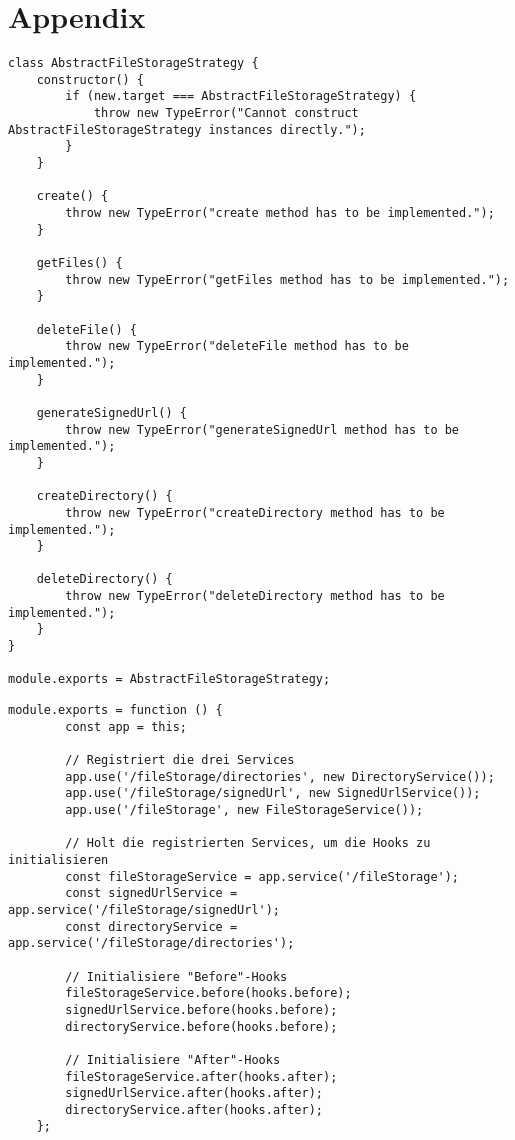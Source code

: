 \appendix
\section{Appendix}
\label{sec:appendix}

\begin{lstlisting}[caption=Abstract file storage strategy, label=code:strategyinterface]
class AbstractFileStorageStrategy {
	constructor() {
		if (new.target === AbstractFileStorageStrategy) {
			throw new TypeError("Cannot construct AbstractFileStorageStrategy instances directly.");
		}
	}
	
	create() {
		throw new TypeError("create method has to be implemented.");
	}
	
	getFiles() {
		throw new TypeError("getFiles method has to be implemented.");
	}
	
	deleteFile() {
		throw new TypeError("deleteFile method has to be implemented.");
	}
	
	generateSignedUrl() {
		throw new TypeError("generateSignedUrl method has to be implemented.");
	}
	
	createDirectory() {
		throw new TypeError("createDirectory method has to be implemented.");
	}
	
	deleteDirectory() {
		throw new TypeError("deleteDirectory method has to be implemented.");
	}
}

module.exports = AbstractFileStorageStrategy;
\end{lstlisting}

\begin{lstlisting}[caption=Registrieren des FileStorage Services, label=code:filestorageindex]
	module.exports = function () {
		const app = this;
		
		// Registriert die drei Services
		app.use('/fileStorage/directories', new DirectoryService());
		app.use('/fileStorage/signedUrl', new SignedUrlService());
		app.use('/fileStorage', new FileStorageService());
		
		// Holt die registrierten Services, um die Hooks zu initialisieren
		const fileStorageService = app.service('/fileStorage');
		const signedUrlService = app.service('/fileStorage/signedUrl');
		const directoryService = app.service('/fileStorage/directories');
		
		// Initialisiere "Before"-Hooks
		fileStorageService.before(hooks.before);
		signedUrlService.before(hooks.before);
		directoryService.before(hooks.before);
		
		// Initialisiere "After"-Hooks
		fileStorageService.after(hooks.after);
		signedUrlService.after(hooks.after);
		directoryService.after(hooks.after);
	};
\end{lstlisting}


